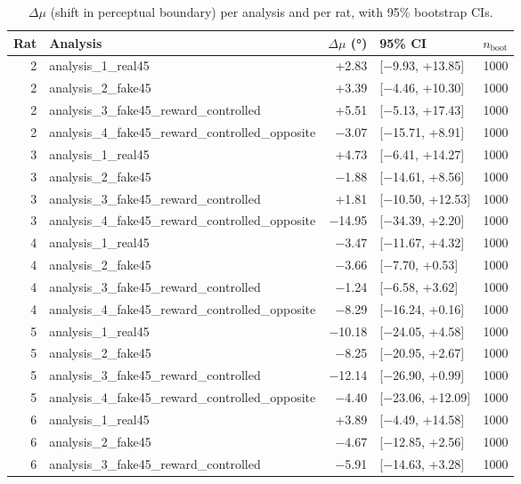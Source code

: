 \begin{table}[htbp]
  \centering
  \caption{$\Delta\mu$ (shift in perceptual boundary) per analysis and per rat, with 95\% bootstrap CIs.}
  \label{tab:choice_delta_mu}
  \begin{tabular}{rlrlr}
    \toprule
    Rat & Analysis & $\Delta\mu$ (°) & 95\% CI & $n_{\mathrm{boot}}$ \\
    \midrule
    2 & analysis\_1\_real45 & +2.83 & [−9.93, +13.85] & 1000 \\
    2 & analysis\_2\_fake45 & +3.39 & [−4.46, +10.30] & 1000 \\
    2 & analysis\_3\_fake45\_reward\_controlled & +5.51 & [−5.13, +17.43] & 1000 \\
    2 & analysis\_4\_fake45\_reward\_controlled\_opposite & −3.07 & [−15.71, +8.91] & 1000 \\
    3 & analysis\_1\_real45 & +4.73 & [−6.41, +14.27] & 1000 \\
    3 & analysis\_2\_fake45 & −1.88 & [−14.61, +8.56] & 1000 \\
    3 & analysis\_3\_fake45\_reward\_controlled & +1.81 & [−10.50, +12.53] & 1000 \\
    3 & analysis\_4\_fake45\_reward\_controlled\_opposite & −14.95 & [−34.39, +2.20] & 1000 \\
    4 & analysis\_1\_real45 & −3.47 & [−11.67, +4.32] & 1000 \\
    4 & analysis\_2\_fake45 & −3.66 & [−7.70, +0.53] & 1000 \\
    4 & analysis\_3\_fake45\_reward\_controlled & −1.24 & [−6.58, +3.62] & 1000 \\
    4 & analysis\_4\_fake45\_reward\_controlled\_opposite & −8.29 & [−16.24, +0.16] & 1000 \\
    5 & analysis\_1\_real45 & −10.18 & [−24.05, +4.58] & 1000 \\
    5 & analysis\_2\_fake45 & −8.25 & [−20.95, +2.67] & 1000 \\
    5 & analysis\_3\_fake45\_reward\_controlled & −12.14 & [−26.90, +0.99] & 1000 \\
    5 & analysis\_4\_fake45\_reward\_controlled\_opposite & −4.40 & [−23.06, +12.09] & 1000 \\
    6 & analysis\_1\_real45 & +3.89 & [−4.49, +14.58] & 1000 \\
    6 & analysis\_2\_fake45 & −4.67 & [−12.85, +2.56] & 1000 \\
    6 & analysis\_3\_fake45\_reward\_controlled & −5.91 & [−14.63, +3.28] & 1000 \\

\end{tabular}
\end{table}
